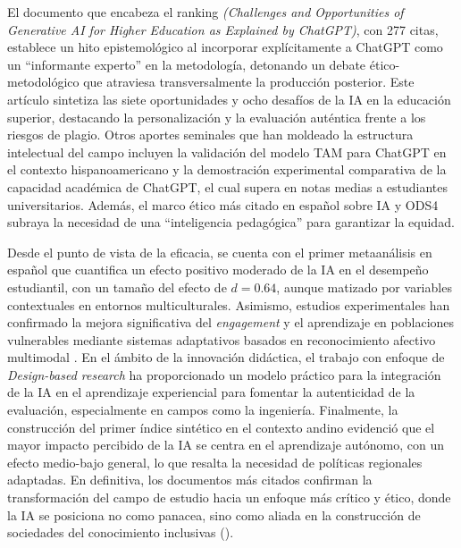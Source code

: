 \documentclass[spanish]{textolivre}
\begin{document}
El documento que encabeza el ranking \textit{(Challenges and Opportunities of Generative AI for Higher Education as Explained by ChatGPT)}, con 277 citas, establece un hito epistemológico al incorporar explícitamente a ChatGPT como un ``informante experto'' en la metodología, detonando un debate ético-metodológico que atraviesa transversalmente la producción posterior. Este artículo sintetiza las siete oportunidades y ocho desafíos de la IA en la educación superior, destacando la personalización y la evaluación auténtica frente a los riesgos de plagio. Otros aportes seminales que han moldeado la estructura intelectual del campo incluyen la validación del modelo TAM para ChatGPT en el contexto hispanoamericano y la demostración experimental comparativa de la capacidad académica de ChatGPT, el cual supera en notas medias a estudiantes universitarios. Además, el marco ético más citado en español sobre IA y ODS4 subraya la necesidad de una ``inteligencia pedagógica'' para garantizar la equidad.

Desde el punto de vista de la eficacia, se cuenta con el primer metaanálisis en español que cuantifica un efecto positivo moderado de la IA en el desempeño estudiantil, con un tamaño del efecto de $d=0.64$, aunque matizado por variables contextuales en entornos multiculturales. Asimismo, estudios experimentales han confirmado la mejora significativa del \textit{engagement} y el aprendizaje en poblaciones vulnerables mediante sistemas adaptativos basados en reconocimiento afectivo multimodal \cite{standen2020}. En el ámbito de la innovación didáctica, el trabajo con enfoque de \textit{Design-based research} ha proporcionado un modelo práctico para la integración de la IA en el aprendizaje experiencial para fomentar la autenticidad de la evaluación, especialmente en campos como la ingeniería. Finalmente, la construcción del primer índice sintético en el contexto andino evidenció que el mayor impacto percibido de la IA se centra en el aprendizaje autónomo, con un efecto medio-bajo general, lo que resalta la necesidad de políticas regionales adaptadas. En definitiva, los documentos más citados confirman la transformación del campo de estudio hacia un enfoque más crítico y ético, donde la IA se posiciona no como panacea, sino como aliada en la construcción de sociedades del conocimiento inclusivas ().
\end{document}
